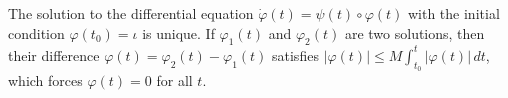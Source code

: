 The solution to the differential equation $\dot{\varphi}(t) = \psi(t) \circ \varphi(t)$ with the initial condition $\varphi(t_0) = \iota$ is unique. If $\varphi_1(t)$ and $\varphi_2(t)$ are two solutions, then their difference $\varphi(t) = \varphi_2(t) - \varphi_1(t)$ satisfies $|\varphi(t)| \leq M \int_{t_0}^{t} |\varphi(t)| \, dt$, which forces $\varphi(t) = 0$ for all $t$.
